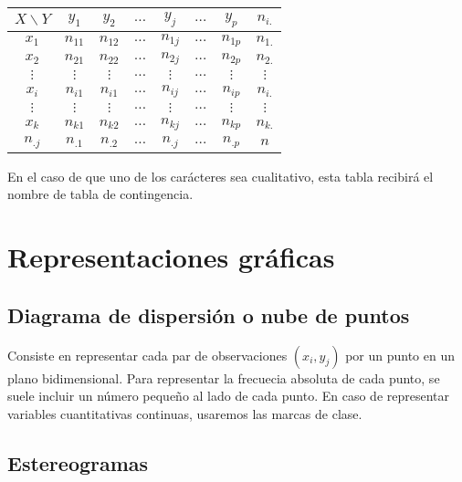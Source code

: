 \begin{center}
    \begin{tabular}{c|c|c|c|c|c|c|c}
        $X \backslash Y$ & $y_1$    & $y_2$    & $\ldots$ & $y_j$    & $\ldots$ & $y_p$    & $n_{i.}$ \\
        \hline
        $x_1$            & $n_{11}$ & $n_{12}$ & $\ldots$ & $n_{1j}$ & $\ldots$ & $n_{1p}$ & $n_{1.}$ \\
        \hline
        $x_2$            & $n_{21}$ & $n_{22}$ & $\ldots$ & $n_{2j}$ & $\ldots$ & $n_{2p}$ & $n_{2.}$ \\
        \hline
        $\vdots$         & $\vdots$ & $\vdots$ & $\ldots$ & $\vdots$ & $\ldots$ & $\vdots$ & $\vdots$ \\
        \hline
        $x_i$            & $n_{i1}$ & $n_{i1}$ & $\ldots$ & $n_{ij}$ & $\ldots$ & $n_{ip}$ & $n_{i.}$ \\
        \hline
        $\vdots$         & $\vdots$ & $\vdots$ & $\ldots$ & $\vdots$ & $\ldots$ & $\vdots$ & $\vdots$ \\
        \hline
        $x_k$            & $n_{k1}$ & $n_{k2}$ & $\ldots$ & $n_{kj}$ & $\ldots$ & $n_{kp}$ & $n_{k.}$ \\
        \hline
        $n_{.j}$         & $n_{\text{.}1}$ & $n_{\text{.}2}$ & $\ldots$ & $n_{.j}$ & $\ldots$ & $n_{.p}$ & $n$
    \end{tabular}
\end{center}

En el caso de que uno de los carácteres sea cualitativo, esta tabla recibirá el nombre de tabla de contingencia.

\section{Representaciones gráficas}
\subsection{Diagrama de dispersión o nube de puntos}

Consiste en representar cada par de observaciones $(x_i, y_j)$ por un punto en un plano bidimensional.
Para representar la frecuecia absoluta de cada punto, se suele incluir un número pequeño al lado de cada punto.
En caso de representar variables cuantitativas continuas, usaremos las marcas de clase.

\subsection{Estereogramas}

